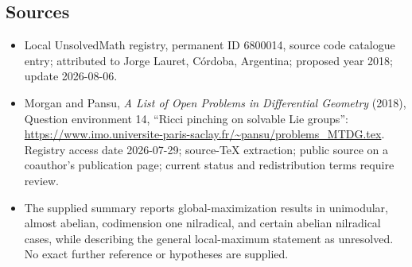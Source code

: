 \documentclass[11pt]{article}
\begin{document}
\subsection{Sources}
\begin{itemize}
\item Local UnsolvedMath registry, permanent ID 6800014, source code catalogue entry; attributed to Jorge Lauret, C\'ordoba, Argentina; proposed year 2018; update 2026-08-06.
\item Morgan and Pansu, \emph{A List of Open Problems in Differential Geometry} (2018), Question environment 14, ``Ricci pinching on solvable Lie groups'': \url{https://www.imo.universite-paris-saclay.fr/~pansu/problems_MTDG.tex}. Registry access date 2026-07-29; source-TeX extraction; public source on a coauthor's publication page; current status and redistribution terms require review.
\item The supplied summary reports global-maximization results in unimodular, almost abelian, codimension one nilradical, and certain abelian nilradical cases, while describing the general local-maximum statement as unresolved. No exact further reference or hypotheses are supplied.
\end{itemize}
\end{document}
